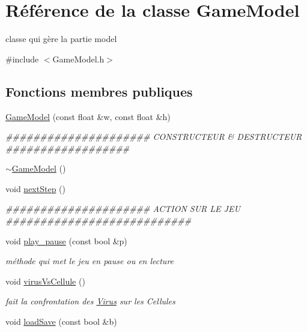 \hypertarget{classGameModel}{
\section{Référence de la classe GameModel}
\label{classGameModel}
}


classe qui gère la partie model  




{\ttfamily \#include $<$GameModel.h$>$}

\subsection*{Fonctions membres publiques}
\begin{DoxyCompactItemize}
\item 
\hyperlink{classGameModel_a35fc3d6624b6ac34ec46f3fd2bbdf4b2}{GameModel} (const float \&w, const float \&h)
\begin{DoxyCompactList}\small\item\em \#\#\#\#\#\#\#\#\#\#\#\#\#\#\#\#\#\#\#\#\# CONSTRUCTEUR \& DESTRUCTEUR \#\#\#\#\#\#\#\#\#\#\#\#\#\#\#\#\#\# \end{DoxyCompactList}\item 
\hyperlink{classGameModel_ac72de76e47bb6be675de3c49c15ac4af}{$\sim$GameModel} ()
\item 
void \hyperlink{classGameModel_adc32d84c6f151f31c5929a16d6cc21bd}{nextStep} ()
\begin{DoxyCompactList}\small\item\em \#\#\#\#\#\#\#\#\#\#\#\#\#\#\#\#\#\#\#\#\# ACTION SUR LE JEU \#\#\#\#\#\#\#\#\#\#\#\#\#\#\#\#\#\#\#\#\#\#\#\#\#\#\# \end{DoxyCompactList}\item 
void \hyperlink{classGameModel_aaedc4f1b9031d8570d9233bcab2557e2}{play\_\-pause} (const bool \&p)
\begin{DoxyCompactList}\small\item\em méthode qui met le jeu en pause ou en lecture \end{DoxyCompactList}\item 
void \hyperlink{classGameModel_a6b5a7b591834d44938171605338420e2}{virusVsCellule} ()
\begin{DoxyCompactList}\small\item\em fait la confrontation des \hyperlink{classVirus}{Virus} sur les Cellules \end{DoxyCompactList}\item 
void \hyperlink{classGameModel_ac3acc45a276a041dfdbe28442c997ed1}{loadSave} (const bool \&b)

\end{DoxyCompactItemize}
